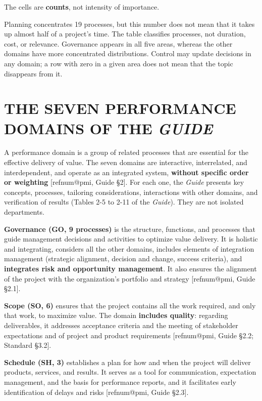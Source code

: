 \documentclass[12pt,a4paper,article,oneside,brazil,english]{abntex2}
\makeatletter
\newcommand{\refnum}[1]{\csname refnum@#1\endcsname}
\makeatother
\begin{document}
The cells are \textbf{counts}, not intensity of importance.

Planning concentrates 19 processes, but this number does not mean that it takes up almost half of a project's time. The table classifies processes, not duration, cost, or relevance. Governance appears in all five areas, whereas the other domains have more concentrated distributions. Control may update decisions in any domain; a row with zero in a given area does not mean that the topic disappears from it.

\section{THE SEVEN PERFORMANCE DOMAINS OF THE \textit{GUIDE}}

A performance domain is a group of related processes that are essential for the effective delivery of value. The seven domains are interactive, interrelated, and interdependent, and operate as an integrated system, \textbf{without specific order or weighting} [\refnum{pmi}, Guide §2]. For each one, the \textit{Guide} presents key concepts, processes, tailoring considerations, interactions with other domains, and verification of results (Tables 2-5 to 2-11 of the \textit{Guide}). They are not isolated departments.

\textbf{Governance (GO, 9 processes)} is the structure, functions, and processes that guide management decisions and activities to optimize value delivery. It is holistic and integrating, considers all the other domains, includes elements of integration management (strategic alignment, decision and change, success criteria), and \textbf{integrates risk and opportunity management}. It also ensures the alignment of the project with the organization's portfolio and strategy [\refnum{pmi}, Guide §2.1].

\textbf{Scope (SO, 6)} ensures that the project contains all the work required, and only that work, to maximize value. The domain \textbf{includes quality}: regarding deliverables, it addresses acceptance criteria and the meeting of stakeholder expectations and of project and product requirements [\refnum{pmi}, Guide §2.2; Standard §3.2].

\textbf{Schedule (SH, 3)} establishes a plan for how and when the project will deliver products, services, and results. It serves as a tool for communication, expectation management, and the basis for performance reports, and it facilitates early identification of delays and risks [\refnum{pmi}, Guide §2.3].
\end{document}
